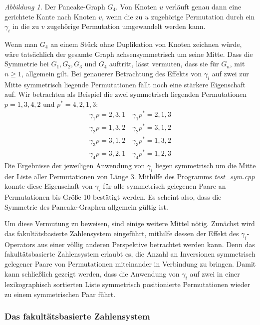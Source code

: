 \documentclass[a4paper, 10pt, ngerman]{article}
\begin{document}
\newline \newline
\emph{Abbildung 1.} Der Pancake-Graph $G_4$. Von Knoten $u$ verläuft genau dann eine gerichtete Kante nach Knoten $v$, wenn die zu $u$ zugehörige Permutation durch ein $\gamma_i$ in die zu $v$ zugehörige Permutation umgewandelt werden kann.
\newpage

Wenn man $G_4$ an einem Stück ohne Duplikation von Knoten zeichnen würde, wäre tatsächlich der gesamte Graph achsensymmetrisch um seine Mitte. Dass die Symmetrie bei $G_1, G_2, G_3$ und $G_4$ auftritt, lässt vermuten, dass sie für $G_n$, mit $n \ge 1$, allgemein gilt.
Bei genauerer Betrachtung des Effekts von $\gamma_i$ auf zwei zur Mitte symmetrisch liegende Permutationen fällt noch eine stärkere Eigenschaft auf. Wir betrachten als Beispiel die zwei symmetrisch liegenden Permutationen $p = 1,3,4,2$ und $p^* = 4, 2, 1, 3$:
\begin{align*}
    \gamma_1 p = 2, 3, 1 \quad \gamma_1 p^* = 2, 1, 3 \\
    \gamma_2 p = 1, 3, 2 \quad \gamma_2 p^* = 3, 1, 2 \\
    \gamma_3 p = 3, 1, 2 \quad \gamma_3 p^* = 1, 3, 2 \\
    \gamma_4 p = 3, 2, 1 \quad \gamma_4 p^* = 1, 2, 3
\end{align*}
Die Ergebnisse der jeweiligen Anwendung von $\gamma_i$ liegen symmetrisch um die Mitte der Liste aller Permutationen von Länge 3. Mithilfe des Programms \emph{test\_sym.cpp} konnte diese Eigenschaft von $\gamma_i$ für alle symmetrisch gelegenen Paare an Permutationen bis Größe 10 bestätigt werden. Es scheint also, dass die Symmetrie des Pancake-Graphen allgemein gültig ist.

Um diese Vermutung zu beweisen, sind einige weitere Mittel nötig. Zunächst wird das fakultätsbasierte Zahlensystem eingeführt, mithilfe dessen der Effekt des $\gamma_i$-Operators aus einer völlig anderen Perspektive betrachtet werden kann. Denn das fakultätsbasierte Zahlensystem erlaubt es, die Anzahl an Inversionen symmetrisch gelegener Paare von Permutationen miteinander in Verbindung zu bringen. Damit kann schließlich gezeigt werden, dass die Anwendung von $\gamma_i$ auf zwei in einer lexikographisch sortierten Liste symmetrisch positionierte Permutationen wieder zu einem symmetrischen Paar führt.

\subsubsection*{Das fakultätsbasierte Zahlensystem}
\end{document}
